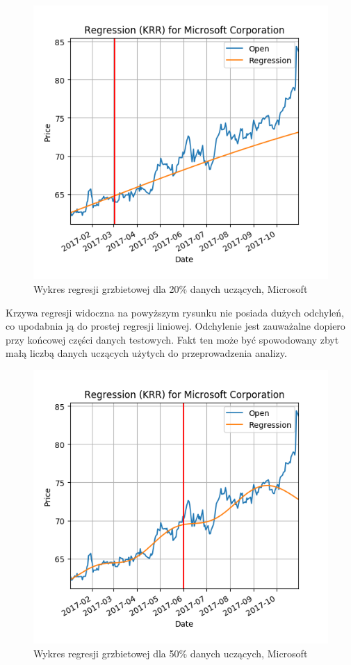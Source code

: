 \begin{figure}[ht]
\centering
\includegraphics[scale=0.4]{pictures/plots/microsoft_krr_20.png}
\caption{Wykres regresji grzbietowej dla 20\% danych uczących, Microsoft}
\label{fig:microsoft_krr_20}
\end{figure}

Krzywa regresji widoczna na powyższym rysunku nie posiada dużych odchyleń, co upodabnia ją do prostej regresji liniowej.
Odchylenie jest zauważalne dopiero przy końcowej części danych testowych. Fakt ten może być spowodowany zbyt małą liczbą danych uczących użytych do przeprowadzenia analizy.\\

\begin{figure}[ht]
\centering
\includegraphics[scale=0.4]{pictures/plots/microsoft_krr_50.png}
\caption{Wykres regresji grzbietowej dla 50\% danych uczących, Microsoft}
\label{fig:microsoft_krr_50}
\end{figure}

